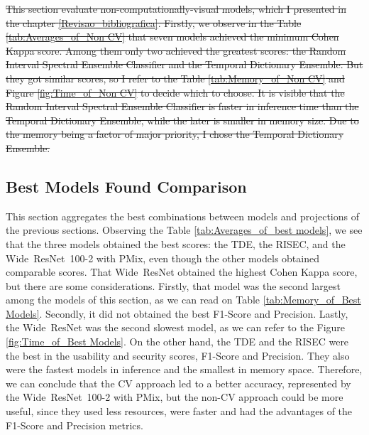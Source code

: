 \sout{
This section evaluate non-computationally-visual models, which I presented in the chapter \ref{Revisao_bibliografica}. Firstly, we observe in the Table \ref{tab:Averages_of_Non CV} that seven models achieved the minimum Cohen Kappa score. Among them only two achieved the greatest scores: the Random Interval Spectral Ensemble Classifier and the Temporal Dictionary Ensemble. But they got similar scores, so I refer to the Table \ref{tab:Memory_of_Non CV} and Figure \ref{fig:Time_of_Non CV} to decide which to choose. It is visible that the Random Interval Spectral Ensemble Classifier is faster in inference time than the Temporal Dictionary Ensemble, while the later is smaller in memory size. Due to the memory being a factor of major priority, I chose the Temporal Dictionary Ensemble. 	 
}






\FloatBarrier

\subsection{Best Models Found Comparison}

This section aggregates the best combinations between models and projections of the previous sections. Observing the Table \ref{tab:Averages_of_best models}, we see that the three models obtained the best scores: the \gls{TDE}, the \gls{RISEC}, and the \mbox{Wide ResNet 100-2} with \gls{PMix}, even though the other models obtained comparable scores. That \mbox{Wide ResNet} obtained the highest Cohen Kappa score, but there are some considerations. Firstly, that model was the second largest among the models of this section, as we can read on Table \ref{tab:Memory_of_Best Models}. Secondly, it did not obtained the best F1-Score and Precision. Lastly, the \mbox{Wide ResNet} was the second slowest model, as we can refer to the Figure \ref{fig:Time_of_Best Models}. On the other hand, the \gls{TDE} and the \gls{RISEC} were the best in the usability and security scores, F1-Score and Precision. They also were the fastest models in inference and the smallest in memory space. Therefore, we can conclude that the \gls{CV} approach led to a better accuracy, represented by the \mbox{Wide ResNet 100-2} with \gls{PMix}, but the non-\gls{CV} approach could be more useful, since they used less resources, were faster and had the advantages of the F1-Score and Precision metrics.


